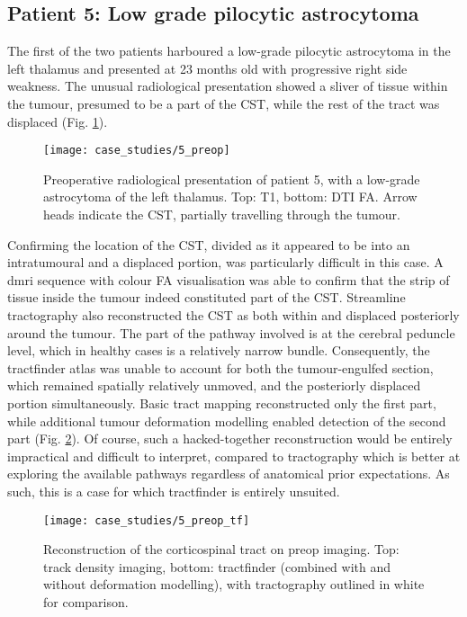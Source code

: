 \subsection{Patient 5: Low grade pilocytic astrocytoma}


The first of the two patients harboured a low-grade pilocytic astrocytoma in the left thalamus and presented at 23 months old with progressive right side weakness.
The unusual radiological presentation showed a sliver of tissue within the tumour, presumed to be a part of the CST, while the rest of the tract was displaced (Fig. \ref{fig:5p}).

\begin{figure}
  \centering
  \texttt{[image: case\_studies/5\_preop]}
  \caption{Preoperative radiological presentation of patient 5, with a low-grade astrocytoma of the left thalamus. Top: T1, bottom: DTI FA. Arrow heads indicate the CST, partially travelling through the tumour.}
  \label{fig:5p}
\end{figure}

Confirming the location of the CST, divided as it appeared to be into an intratumoural and a displaced portion, was particularly difficult in this case.
A \gls{dmri} sequence with colour FA visualisation was able to confirm that the strip of tissue inside the tumour indeed constituted part of the CST.
Streamline tractography also reconstructed the CST as both within and displaced posteriorly around the tumour.
The part of the pathway involved is at the cerebral peduncle level, which in healthy cases is a relatively narrow bundle.
Consequently, the tractfinder atlas was unable to account for both the tumour-engulfed section, which remained spatially relatively unmoved, and the posteriorly displaced portion simultaneously.
Basic tract mapping reconstructed only the first part, while additional tumour deformation modelling enabled detection of the second part (Fig. \ref{fig:5p_cst}).
Of course, such a hacked-together reconstruction would be entirely impractical and difficult to interpret, compared to tractography which is better at exploring the available pathways regardless of anatomical prior expectations.
As such, this is a case for which tractfinder is entirely unsuited.

\begin{figure}
  \centering
  \texttt{[image: case\_studies/5\_preop\_tf]}
  \caption{Reconstruction of the corticospinal tract on preop imaging. Top: track density imaging, bottom: tractfinder (combined with and without deformation modelling), with tractography outlined in white for comparison.}
  \label{fig:5p_cst}
\end{figure}

